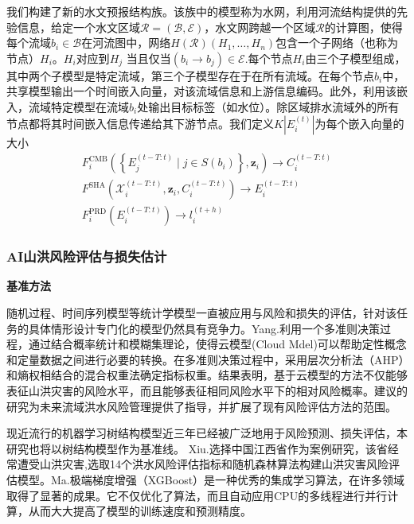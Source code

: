 \documentclass{ctexart}
\begin{document}
我们构建了新的水文预报结构族。该族中的模型称为水网，利用河流结构提供的先验信息，给定一个水文区域$\mathcal{R}=(\mathcal{B}, \mathcal{E})$，水文网跨越一个区域$\mathcal{R}$的计算图，使得每个流域$b_{i} \in \mathcal{B}$在河流图中，网络$H(\mathcal{R})\left(H_{1}, \ldots, H_{n}\right)$包含一个子网络（也称为节点）$H_{i}$。$H_{i}$对应到$H_{j}$ 当且仅当$\left(b_{i} \rightarrow b_{j}\right) \in \mathcal{E}$.每个节点$H_{i}$由三个子模型组成，其中两个子模型是特定流域，第三个子模型存在于在所有流域。在每个节点$b_{i}$中，共享模型输出一个时间嵌入向量，对该流域信息和上游信息编码。此外，利用该嵌入，流域特定模型在流域$b_{i}$处输出目标标签（如水位）。除区域排水流域外的所有节点都将其时间嵌入信息传递给其下游节点。我们定义$K\left|E_{i}^{(t)}\right|$为每个嵌入向量的大小
$$
    \begin{array}{l}
        F_{i}^{\mathrm{CMB}}\left(\left\{E_{j}^{(t-T: t)} \mid j \in S\left(b_{i}\right)\right\}, \mathbf{z}_{i}\right) \rightarrow C_{i}^{(t-T: t)} \\
        F^{\mathrm{SHA}}\left(\mathcal{X}_{i}^{(t-T: t)}, \mathbf{z}_{i}, C_{i}^{(t-T: t)}\right) \rightarrow E_{i}^{(t-T: t)}                       \\
        F_{i}^{\mathrm{PRD}}\left(E_{i}^{(t-T: t)}\right) \rightarrow l_{i}^{(t+h)}
    \end{array}
$$

\subsubsection{AI山洪风险评估与损失估计}
\textbf{基准方法}

随机过程、时间序列模型等统计学模型一直被应用与风险和损失的评估，针对该任务的具体情形设计专门化的模型仍然具有竞争力。Yang.\cite{yang2018cloud}利用一个多准则决策过程，通过结合概率统计和模糊集理论，使得云模型(Cloud Mdel)可以帮助定性概念和定量数据之间进行必要的转换。在多准则决策过程中，采用层次分析法（AHP）和熵权相结合的混合权重法确定指标权重。结果表明，基于云模型的方法不仅能够表征山洪灾害的风险水平，而且能够表征相同风险水平下的相对风险概率。建议的研究为未来流域洪水风险管理提供了指导，并扩展了现有风险评估方法的范围。

现近流行的机器学习树结构模型近三年已经被广泛地用于风险预测、损失评估，本研究也将以树结构模型作为基准线。
Xiu.\cite{xiuqin2019risk}选择中国江西省作为案例研究，该省经常遭受山洪灾害,选取14个洪水风险评估指标和随机森林算法构建山洪灾害风险评估模型。Ma.\cite{ma2021xgboost}极端梯度增强（XGBoost）是一种优秀的集成学习算法，在许多领域取得了显著的成果。它不仅优化了算法，而且自动应用CPU的多线程进行并行计算，从而大大提高了模型的训练速度和预测精度。
\end{document}
